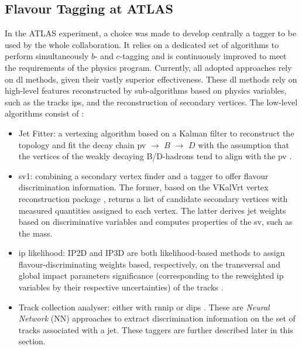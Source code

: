 \subsection{Flavour Tagging at ATLAS}

In the ATLAS experiment, a choice was made to develop centrally a tagger to be used by the whole collaboration. It relies on a dedicated set of algorithms to perform simultaneously $b$- and $c$-tagging and is continuously improved to meet the requirements of the physics program. Currently, all adopted approaches rely on \gls{dl} methods, given their vastly superior effectiveness. These \gls{dl} methods rely on high-level features reconstructed by sub-algorithms based on physics variables, such as the tracks \glspl{ip}, and the reconstruction of secondary vertices. The low-level algorithms consist of \cite{Paganini:2289214}:
\begin{itemize}
\item Jet Fitter: a vertexing algorithm based on a Kalman filter to reconstruct the topology and fit the decay chain \gls{pv} $\rightarrow$ $B$ $\rightarrow$ $D$ with the assumption that the vertices of the weakly decaying B/D-hadrons tend to align with the \gls{pv} \cite{ATL-PHYS-PUB-2018-025}. 
\item \gls{sv1}: combining a secondary vertex finder and a tagger to offer flavour discrimination information. The former, based on the VKalVrt vertex reconstruction package \cite{Kostyukhin:685551}, returns a list of candidate secondary vertices with measured quantities assigned to each vertex. The latter derives jet weights based on discriminative variables and computes properties of the \gls{sv}, such as the mass. 
\item \gls{ip} likelihood: IP2D and IP3D are both likelihood-based methods to assign flavour-discriminating weights based, respectively, on the transversal and global impact parameters significance (corresponding to the reweighted \gls{ip} variables by their respective uncertainties) of the tracks \cite{ATLAS:2017bcq}. 
\item Track collection analyser: either with \gls{rnnip} \cite{ATL-PHYS-PUB-2017-003} or \gls{dips} \cite{ATL-PHYS-PUB-2020-014}. These are \textit{Neural Network} (NN) approaches to extract discrimination information on the set of tracks associated with a jet. These taggers are further described later in this section.  
\end{itemize}

